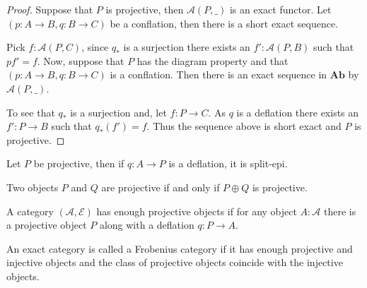     \begin{proof}
        Suppose that $P$ is projective, then $\mathcal{A}(P,\_)$ is an exact functor. Let $(p:A\rightarrow B,q:B\rightarrow C)$ be a conflation, then there is a short exact sequence.
        \begin{center}
        \end{center}
        Pick $f:\mathcal{A}(P,C)$, since $q_*$ is a surjection there exists an $f':\mathcal{A}(P,B)$ such that $pf'=f$.
        Now, suppose that $P$ has the diagram property and that $(p:A\rightarrow B,q:B\rightarrow C)$ is a conflation. Then there is an exact sequence in $\textbf{Ab}$ by $\mathcal{A}(P,\_)$.
        \begin{center}
        \end{center}
        To see that $q_*$ is a surjection and, let $f:P\rightarrow C$. As $q$ is a deflation there exists an $f':P\rightarrow B$ such that $q_*(f')=f$. Thus the sequence above is short exact and $P$ is projective. 
    \end{proof}

    \begin{corollary}
        Let $P$ be projective, then if $q:A\rightarrow P$ is a deflation, it is split-epi.
    \end{corollary}

    \begin{corollary}
        Two objects $P$ and $Q$ are projective if and only if $P\oplus Q$ is projective.
    \end{corollary}

    \begin{definition}
        A category $(\mathcal{A}, \mathcal{E})$ has enough projective objects if for any object $A:\mathcal{A}$ there is a projective object $P$ along with a deflation $q:P\rightarrow A$.
    \end{definition}

    \begin{definition}
        An exact category is called a Frobenius category if it has enough projective and injective objects and the class of projective objects coincide with the injective objects.
    \end{definition}

